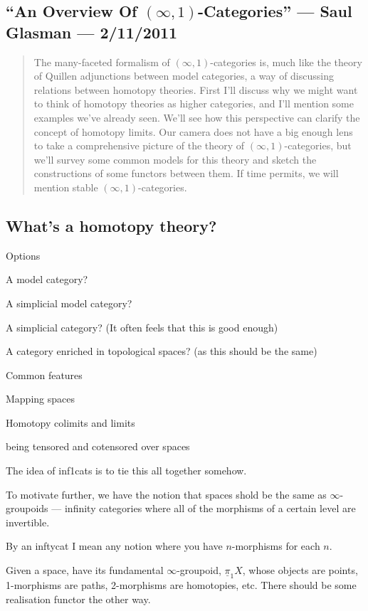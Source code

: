 \documentclass[11pt]{article}
\newcommand{\KanSemResponse}[1]
{
\thispagestyle{fancy}
\subsection*{#1}
}
\begin{document}
\begin{RuneBabytop}
\pagebreak
\end{RuneBabytop}
\begin{SaulInftyOneCats}
\KanSemResponse
{``An Overview Of $(\infty, 1)$-Categories'' --- Saul Glasman --- 2/11/2011}
\begin{abstract}
The many-faceted formalism of $(\infty, 1)$-categories is, much like the 
theory of Quillen adjunctions between model categories, a way of 
discussing relations between homotopy theories. First I'll discuss why 
we might want to think of homotopy theories as higher categories, and 
I'll mention some examples we've already seen. We'll see how this 
perspective can clarify the concept of homotopy limits. Our camera does 
not have a big enough lens to take a comprehensive picture of the theory 
of $(\infty, 1)$-categories, but we'll survey some common models for this 
theory and sketch the constructions of some functors between them. If 
time permits, we will mention stable $(\infty, 1)$-categories.
\end{abstract}
\subsection*{What's a homotopy theory?}
Options
\begin{itemise}
\item A model category?
\item A simplicial model category?
\item A simplicial category? (It often feels that this is good enough)
\item A category enriched in topological spaces? (as this should be the same)
\end{itemise}
Common features
\begin{itemise}
\item Mapping spaces
\item Homotopy colimits and limits
\item being tensored and cotensored over spaces
\end{itemise}
The idea of inf1cats is to tie this all together somehow.

To motivate further, we have the notion that spaces shold be the same as $\infty$-groupoids --- infinity categories where all of the morphisms of a certain level are invertible.

By an inftycat I mean any notion where you have $n$-morphisms for each $n$.

Given a space, have its fundamental $\infty$-groupoid, $\underline\pi_1{X}$, whose objects are points, 1-morphisms are paths, 2-morphisms are homotopies, etc. There should be some realisation functor the other way.


\end{SaulInftyOneCats}
\end{document}

